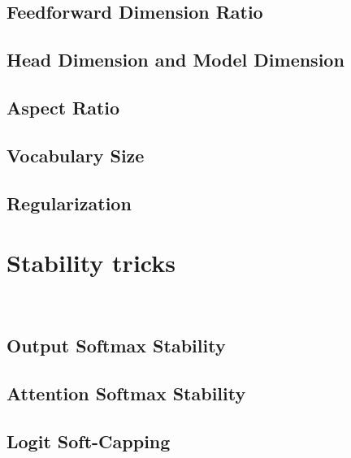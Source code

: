 \subsection{Feedforward Dimension Ratio}











\subsection{Head Dimension and Model Dimension}

\subsection{Aspect Ratio}

\subsection{Vocabulary Size}

\subsection{Regularization}



\clearpage
{\chaptoc\noindent\begin{minipage}[inner sep=0,outer sep=0]{0.9\linewidth}\section{Stability tricks}\end{minipage}}
\\

\subsection{Output Softmax Stability}

\subsection{Attention Softmax Stability}

\subsection{Logit Soft-Capping}



